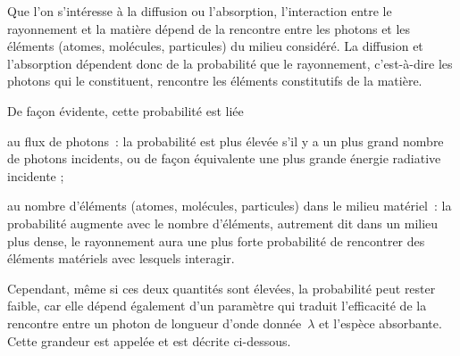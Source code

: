\sk
Que l'on s'intéresse à la diffusion ou l'absorption, l’interaction entre le rayonnement et la matière dépend de la rencontre entre les photons et les éléments (atomes, molécules, particules) du milieu considéré. La diffusion et l'absorption dépendent donc de la probabilité que le rayonnement, c'est-à-dire les photons qui le constituent, rencontre les éléments constitutifs de la matière. 

\sk
De façon évidente, cette probabilité est liée 
\begin{citemize}
\item au flux de photons~: la probabilité est plus élevée s'il y a un plus grand nombre de photons incidents, ou de façon équivalente une plus grande énergie radiative incidente ;
\item au nombre d'éléments (atomes, molécules, particules) dans le milieu matériel~: la probabilité augmente avec le nombre d'éléments, autrement dit dans un milieu plus dense, le rayonnement aura une plus forte probabilité de rencontrer des éléments matériels avec lesquels interagir. 
\end{citemize}
Cependant, même si ces deux quantités sont élevées, la probabilité peut rester faible, car elle dépend également d'un paramètre qui traduit l'efficacité de la rencontre entre un photon de longueur d'onde donnée~$\lambda$ et l'espèce absorbante. Cette grandeur est appelée  et est décrite ci-dessous.


